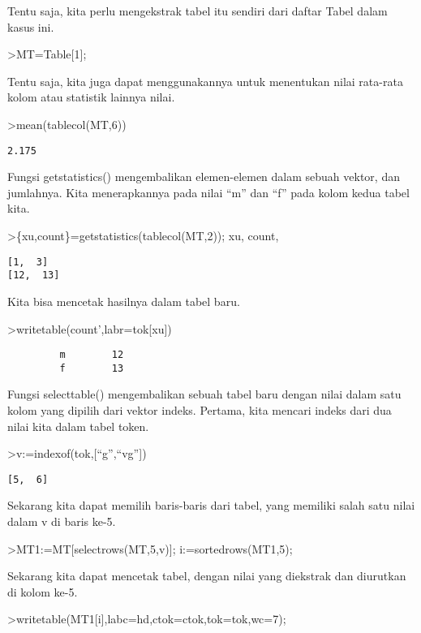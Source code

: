 \documentclass[
]{book}
\begin{document}
Tentu saja, kita perlu mengekstrak tabel itu sendiri dari daftar Tabel dalam kasus ini.

\textgreater MT=Table{[}1{]};

Tentu saja, kita juga dapat menggunakannya untuk menentukan nilai rata-rata kolom atau statistik lainnya nilai.

\textgreater mean(tablecol(MT,6))

\begin{verbatim}
2.175
\end{verbatim}

Fungsi getstatistics() mengembalikan elemen-elemen dalam sebuah vektor, dan jumlahnya. Kita menerapkannya pada nilai ``m'' dan ``f'' pada kolom kedua tabel kita.

\textgreater\{xu,count\}=getstatistics(tablecol(MT,2)); xu, count,

\begin{verbatim}
[1,  3]
[12,  13]
\end{verbatim}

Kita bisa mencetak hasilnya dalam tabel baru.

\textgreater writetable(count',labr=tok{[}xu{]})

\begin{verbatim}
         m        12
         f        13
\end{verbatim}

Fungsi selecttable() mengembalikan sebuah tabel baru dengan nilai dalam satu kolom yang dipilih dari vektor indeks. Pertama, kita mencari indeks dari dua nilai kita dalam tabel token.

\textgreater v:=indexof(tok,{[}``g'',``vg''{]})

\begin{verbatim}
[5,  6]
\end{verbatim}

Sekarang kita dapat memilih baris-baris dari tabel, yang memiliki salah satu nilai dalam v di baris ke-5.

\textgreater MT1:=MT{[}selectrows(MT,5,v){]}; i:=sortedrows(MT1,5);

Sekarang kita dapat mencetak tabel, dengan nilai yang diekstrak dan diurutkan di kolom ke-5.

\textgreater writetable(MT1{[}i{]},labc=hd,ctok=ctok,tok=tok,wc=7);
\end{document}
